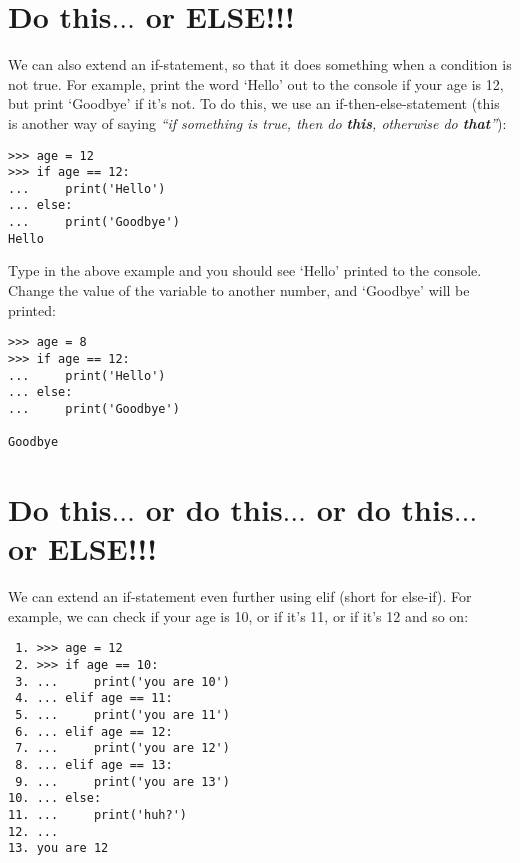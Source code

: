 \section{Do this$\ldots$ or ELSE!!!}

We can also extend an if-statement, so that it does something when a condition is not true.  For example, print the word `Hello' out to the console if your age is 12, but print `Goodbye' if it's not.  To do this, we use an if-then-else-statement (this is another way of saying \emph{``if something is true, then do \textbf{this}, otherwise do \textbf{that}''}):

\begin{listing}
\begin{verbatim}
>>> age = 12
>>> if age == 12:
...     print('Hello')
... else:
...     print('Goodbye')
Hello
\end{verbatim}
\end{listing}

Type in the above example and you should see `Hello' printed to the console.  Change the value of the variable  to another number, and `Goodbye' will be printed:

\begin{listing}
\begin{verbatim}
>>> age = 8
>>> if age == 12:
...     print('Hello')
... else:
...     print('Goodbye')

Goodbye
\end{verbatim}
\end{listing}

\section{Do this$\ldots$ or do this$\ldots$ or do this$\ldots$ or ELSE!!!}

We can extend an if-statement even further using elif (short for else-if). For example, we can check if your age is 10, or if it's 11, or if it's 12 and so on:

\begin{listing}
\begin{verbatim}
 1. >>> age = 12
 2. >>> if age == 10:
 3. ...     print('you are 10')
 4. ... elif age == 11:
 5. ...     print('you are 11')
 6. ... elif age == 12:
 7. ...     print('you are 12')
 8. ... elif age == 13:
 9. ...     print('you are 13')
10. ... else:
11. ...     print('huh?')
12. ...
13. you are 12
\end{verbatim}
\end{listing}

